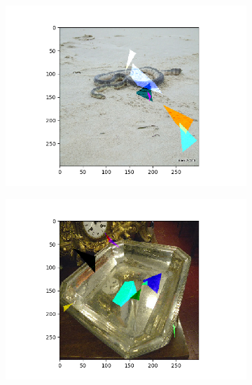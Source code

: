 \documentclass[conference]{IEEEtran}
\begin{document}
\begin{figure}[htbp]
\centering
\begin{subfigure}[t]{.4\textwidth}
  \centering
  \includegraphics[width=1\linewidth]{fig/misclass1.png}
\end{subfigure}
\begin{subfigure}[t]{.4\textwidth}
  \centering
  \includegraphics[width=1\linewidth]{fig/misclass2.png}
\end{subfigure}
\\

\end{figure}
\end{document}
